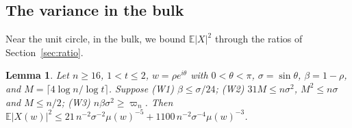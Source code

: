 \documentclass[11pt]{amsart}
\newtheorem{lemma}[theorem]{Lemma}
\theoremstyle{definition}
\theoremstyle{remark}
\numberwithin{equation}{section}
\newcommand{\E}{\mathbb{E}}
\begin{document}
\subsection{The variance in the bulk}
Near the unit circle, in the bulk, we bound $\E|X|^2$ through the ratios of Section~\ref{sec:ratio}.

\begin{lemma}\label{lem:near1-weighted}
Let $n\ge16$, $1<t\le2$, $w=\rho e^{i\theta}$ with $0<\theta<\pi$, $\sigma=\sin\theta$, $\beta=1-\rho$, and $M=\lceil4\log n/\log t\rceil$. Suppose
(W1) $\beta\le\sigma/24$; (W2) $31M\le n\sigma^2$, $M^2\le n\sigma$ and $M\le n/2$; (W3) $n\beta\sigma^2\ge\varpi_n$.
Then $\E|X(w)|^2\le21\,n^{-2}\sigma^{-2}\mu(w)^{-5}+1100\,n^{-2}\sigma^{-4}\mu(w)^{-3}$.
\end{lemma}
\end{document}
